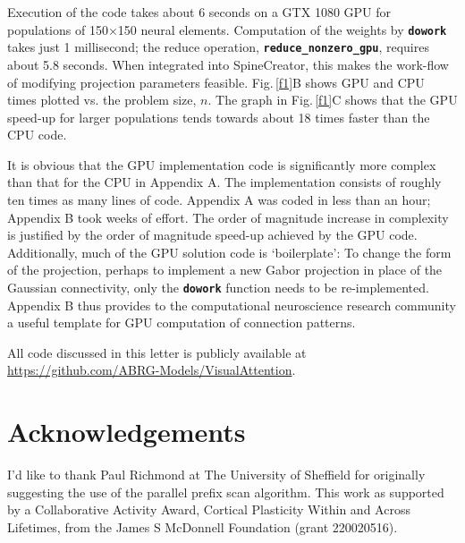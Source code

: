 \documentclass[12pt, a4paper]{article}
\newcommand{\code}[1]{\textbf{\texttt{#1}}}
\begin{document}
Execution of the code takes about 6 seconds on a GTX 1080 GPU for populations
of 150$\times$150 neural elements.  Computation of the weights
by \code{dowork} takes just 1 millisecond; the reduce
operation, \code{reduce\_nonzero\_gpu}, requires about 5.8 seconds. When
integrated into SpineCreator, this makes the work-flow of modifying projection
parameters feasible. Fig.\,\ref{f1}B shows GPU and CPU times plotted vs. the
problem size, $n$. The graph in Fig.\,\ref{f1}C shows that the GPU speed-up
for larger populations tends towards about 18 times faster than the CPU code.

It is obvious that the GPU implementation code is significantly more complex
than that for the CPU in Appendix A. The implementation consists of roughly
ten times as many lines of code. Appendix A was coded in less than an hour;
Appendix B took weeks of effort. The order of magnitude increase in complexity
is justified by the order of magnitude speed-up achieved by the GPU code.
%
Additionally, much of the GPU solution code is `boilerplate': To change the
form of the projection, perhaps to implement a new Gabor projection in place
of the Gaussian connectivity, only the \code{dowork} function needs to be
re-implemented. Appendix B thus provides to the computational neuroscience
research community a useful template for GPU computation of connection
patterns.
%

All code discussed in this letter is publicly available
at \url{https://github.com/ABRG-Models/VisualAttention}.

\section*{Acknowledgements}
I'd like to thank Paul Richmond at The University of Sheffield for originally
suggesting the use of the parallel prefix scan algorithm. This work as
supported by a Collaborative Activity Award, Cortical Plasticity Within and
Across Lifetimes, from the James S McDonnell Foundation (grant
220020516).
\end{document}
